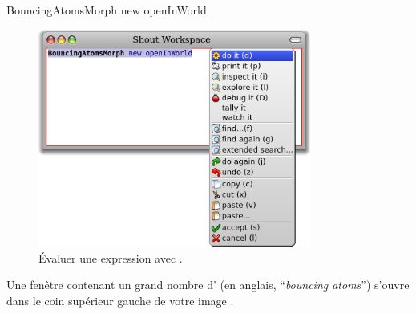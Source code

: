 \documentclass[a4paper,10pt,twoside]{book}
\begin{document}
\section{} %


\begin{code}{}
BouncingAtomsMorph new openInWorld
\end{code}


\begin{figure}[htb]
\centerline {\includegraphics[width=0.8\textwidth]{Doit}}
\caption{Évaluer une expression avec .}
\end{figure}

Une fenêtre contenant un grand nombre d'\bamfr
(en anglais, ``\emph{bouncing atoms}'') s'ouvre dans le coin supérieur
gauche de votre image \pharo.
\end{document}

